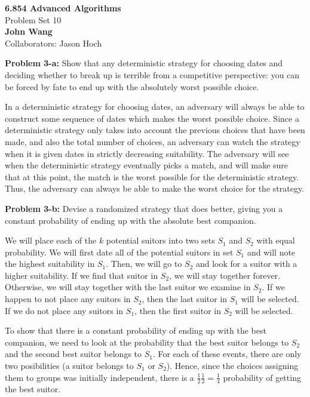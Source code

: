 \documentclass[psamsfonts]{amsart}
\newenvironment{sol}{\vspace{0.25cm}{\large \bfseries Solution:}}{\qedsymbol}
\newenvironment{prob}[1]{\begin{framed}{\large \bfseries Problem #1:}}{\end{framed}}
\newcommand{\makenewtitle}{
    \begin{center}
    {\huge \bfseries 6.854 Advanced Algorithms} \\
    Problem Set 10\\
    \vspace{0.25cm}
    {\bfseries John Wang} \\
    Collaborators: Jason Hoch 
    \end{center}
    \vspace{0.5cm}
}
\begin{document}
\newpage
\makenewtitle

\begin{prob}{3-a}
Show that any deterministic strategy for choosing dates and deciding whether to break up is terrible from a competitive perspective: you can be forced by fate to end up with the absolutely worst possible choice.
\end{prob}
\begin{sol}
In a deterministic strategy for choosing dates, an adversary will always be able to construct some sequence of dates which makes the worst possible choice. Since a deterministic strategy only takes into account the previous choices that have been made, and also the total number of choices, an adversary can watch the strategy when it is given dates in strictly decreasing suitability. The adversary will see when the deterministic strategy eventually picks a match, and will make sure that at this point, the match is the worst possible for the deterministic strategy. Thus, the adversary can always be able to make the worst choice for the strategy.
\end{sol}

\begin{prob}{3-b}
Devise a randomized strategy that does better, giving you a constant probability of ending up with the absolute best companion.
\end{prob}
\begin{sol}
We will place each of the $k$ potential suitors into two sets $S_1$ and $S_2$ with equal probability. We will first date all of the potential suitors in set $S_1$ and will note the highest suitability in $S_1$. Then, we will go to $S_2$ and look for a suitor with a higher suitability. If we find that suitor in $S_2$, we will stay together forever. Otherwise, we will stay together with the last suitor we examine in $S_2$. If we happen to not place any suitors in $S_2$, then the last suitor in $S_1$ will be selected. If we do not place any suitors in $S_1$, then the first suitor in $S_2$ will be selected. 

To show that there is a constant probability of ending up with the best companion, we need to look at the probability that the best suitor belongs to $S_2$ and the second best suitor belongs to $S_1$. For each of these events, there are only two posibilities (a suitor belongs to $S_1$ or $S_2$). Hence, since the choices assigning them to groups was initially independent, there is a $\frac{1}{2} \frac{1}{2} = \frac{1}{4}$ probability of getting the best suitor.
\end{sol}
\end{document}
